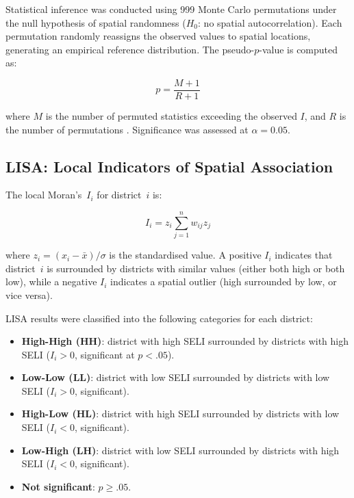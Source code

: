 \documentclass[12pt,a4paper,twoside]{article}
\begin{document}
Statistical inference was conducted using 999 Monte Carlo permutations under the
null hypothesis of spatial randomness ($H_0$: no spatial autocorrelation). Each
permutation randomly reassigns the observed values to spatial locations, generating
an empirical reference distribution. The pseudo-$p$-value is computed as:

\begin{equation}\label{eq:pvalue}
  p = \frac{M + 1}{R + 1}
\end{equation}

where $M$ is the number of permuted statistics exceeding the observed $I$, and
$R$ is the number of permutations \citep{anselin1995lisa}. Significance was
assessed at $\alpha = 0.05$.

\subsection{LISA: Local Indicators of Spatial Association}

The local Moran's~$I_i$ for district~$i$ is:

\begin{equation}\label{eq:lisa}
  I_i = z_i \sum_{j=1}^{n} w_{ij} z_j
\end{equation}

where $z_i = (x_i - \bar{x}) / \sigma$ is the standardised value. A positive
$I_i$ indicates that district~$i$ is surrounded by districts with similar values
(either both high or both low), while a negative $I_i$ indicates a spatial
outlier (high surrounded by low, or vice versa).

LISA results were classified into the following categories for each district:
\begin{itemize}
  \item \textbf{High-High (HH)}: district with high SELI surrounded by districts
        with high SELI ($I_i > 0$, significant at $p < .05$).
  \item \textbf{Low-Low (LL)}: district with low SELI surrounded by districts
        with low SELI ($I_i > 0$, significant).
  \item \textbf{High-Low (HL)}: district with high SELI surrounded by districts
        with low SELI ($I_i < 0$, significant).
  \item \textbf{Low-High (LH)}: district with low SELI surrounded by districts
        with high SELI ($I_i < 0$, significant).
  \item \textbf{Not significant}: $p \geq .05$.
\end{itemize}
\end{document}
